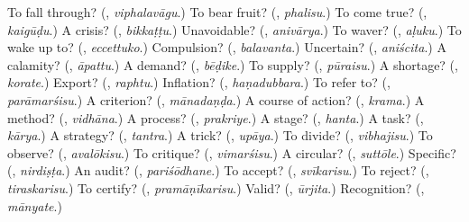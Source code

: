 \begin{tcolorbox}[breakable,colback=teal!4,colframe=teal!35!black,title={Before you move on}]
To fall through? (\textbf{}, \emph{viphalavāgu}.) To bear fruit? (\textbf{}, \emph{phalisu}.) To come true? (\textbf{}, \emph{kaigūḍu}.) A crisis? (\textbf{}, \emph{bikkaṭṭu}.) Unavoidable? (\textbf{}, \emph{anivārya}.) To waver? (\textbf{}, \emph{aḷuku}.) To wake up to? (\textbf{}, \emph{eccettuko}.) Compulsion? (\textbf{}, \emph{balavanta}.) Uncertain? (\textbf{}, \emph{aniścita}.) A calamity? (\textbf{}, \emph{āpattu}.) A demand? (\textbf{}, \emph{bēḍike}.) To supply? (\textbf{}, \emph{pūraisu}.) A shortage? (\textbf{}, \emph{korate}.) Export? (\textbf{}, \emph{raphtu}.) Inflation? (\textbf{}, \emph{haṇadubbara}.) To refer to? (\textbf{}, \emph{parāmarśisu}.) A criterion? (\textbf{}, \emph{mānadaṇḍa}.) A course of action? (\textbf{}, \emph{krama}.) A method? (\textbf{}, \emph{vidhāna}.) A process? (\textbf{}, \emph{prakriye}.) A stage? (\textbf{}, \emph{hanta}.) A task? (\textbf{}, \emph{kārya}.) A strategy? (\textbf{}, \emph{tantra}.) A trick? (\textbf{}, \emph{upāya}.) To divide? (\textbf{}, \emph{vibhajisu}.) To observe? (\textbf{}, \emph{avalōkisu}.) To critique? (\textbf{}, \emph{vimarśisu}.) A circular? (\textbf{}, \emph{suttōle}.) Specific? (\textbf{}, \emph{nirdiṣṭa}.) An audit? (\textbf{}, \emph{pariśōdhane}.) To accept? (\textbf{}, \emph{svīkarisu}.) To reject? (\textbf{}, \emph{tiraskarisu}.) To certify? (\textbf{}, \emph{pramāṇīkarisu}.) Valid? (\textbf{}, \emph{ūrjita}.) Recognition? (\textbf{}, \emph{mānyate}.)
\end{tcolorbox}

